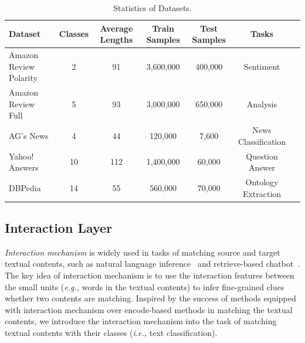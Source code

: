 \documentclass[letterpaper]{article} %
\newcommand{\ie}{\emph{i.e., }}
\newcommand{\eg}{\emph{e.g., }}
\begin{document}
\begin{table}
  \caption{Statistics of Datasets.}
  \label{multi-class}
  \centering
  \begin{tabular}{lcccccc}
    \toprule
    Dataset  &Classes&Average Lengths&Train Samples&Test Samples&Tasks\\
    \midrule
    Amazon Review Polarity	&2&91 	&3,600,000		&400,000& Sentiment\\
	Amazon Review Full		&5&93 		&3,000,000		&650,000&	 Analysis\\
    \midrule
	AG's News				&4&44 	&120,000		&7,600		&News Classification \\
    \midrule
	Yahoo! Answers			&10&112 &1,400,000		&60,000		&Question Answer \\
    \midrule
	DBPedia					&14&55 	&560,000		&70,000		&Ontology Extraction\\
   
    \bottomrule
  \end{tabular}
\end{table}

\subsection{Interaction Layer}
\textit{Interaction mechanism} is widely used in tasks of matching source and target textual contents, such as natural language inference~\cite{llstm} and retrieve-based chatbot~\cite{smn}. The key idea of interaction mechanism is to use the interaction features between the small units (\eg words in the textual contents) to infer fine-grained clues whether two contents are matching. %
Inspired by the success of methods equipped with interaction mechanism over encode-based methods in matching the textual contents, we introduce the interaction mechanism into the task of matching textual contents with their classes (\ie text classification). 
\end{document}
